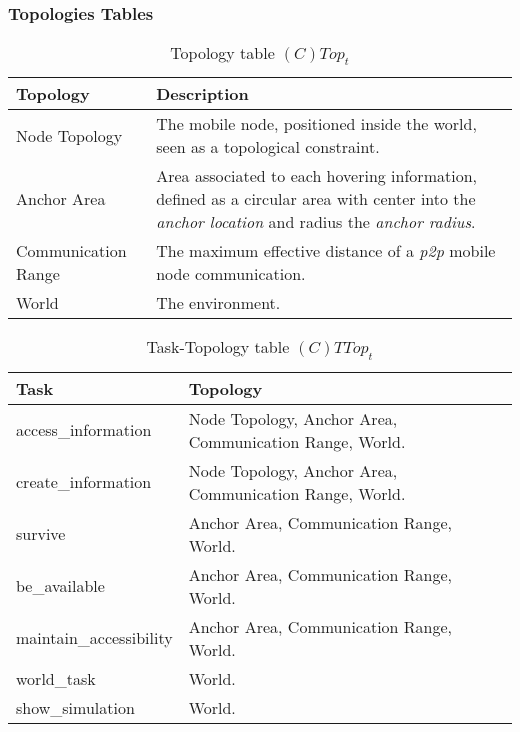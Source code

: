 \subsubsection{Topologies Tables}

\begin{table}[H]
	\centering
	\begin{tabular}{|p{4cm}|p{8cm}|}
			\hline
			\textbf{Topology} & \textbf{Description} \\
			\hline
			Node Topology & The mobile node, positioned inside the world, seen
			as a topological constraint. \\
			\hline
			Anchor Area & Area associated to each hovering information, defined as a
			circular area with center into the \emph{anchor location} and radius the
			\emph{anchor radius}.\\
			\hline
			Communication Range & The maximum effective distance of a \emph{p2p}
			mobile node communication. \\
			\hline
			World & The environment. \\
			\hline
		\end{tabular}
	\caption{Topology table $(C)Top_t$}
	\label{tab:ctopt}
\end{table}

\begin{table}[H]
	\centering
	\begin{tabular}{|p{4cm}|p{8cm}|}
			\hline
			\textbf{Task} & \textbf{Topology} \\
			\hline
			access\_information& Node Topology, Anchor Area, Communication Range, World.\\
			\hline
			create\_information & Node Topology, Anchor Area, Communication Range, World.\\
			\hline
			survive & Anchor Area, Communication Range, World. \\
			\hline
			be\_available & Anchor Area, Communication Range, World. \\
			\hline
			maintain\_accessibility & Anchor Area, Communication Range, World. \\
			\hline
			world\_task & World. \\
			\hline
			show\_simulation & World. \\
			\hline
		\end{tabular}
		\caption{Task-Topology table $(C)TTop_t$}
	\label{tab:cttopt}
\end{table}


